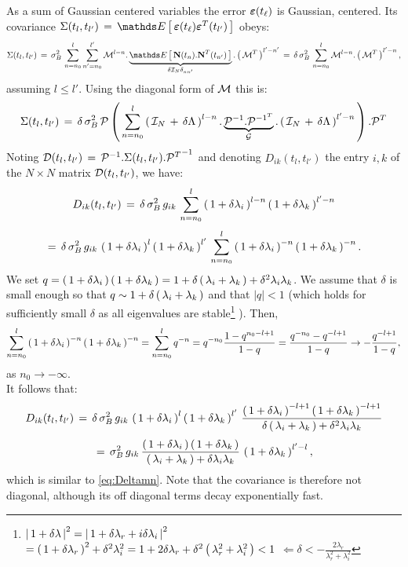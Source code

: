 \documentclass{article}
\begin{document}
 As a sum of Gaussian centered variables the error $\boldsymbol{\varepsilon}(t_\ell)$ is Gaussian, centered. Its covariance $\Sigma(t_l,t_{l'}) \,=\, \Exp{}{\mveb(t_\ell)\mveb^T(t_{l'})}$ obeys:
%
$$
\Sigma(t_l,t_{l'}) \,=\, \sigma_B^2 \, \sum_{n=n_0}^{l} \sum_{n'=n_0}^{l'} \cM^{l-n} . \underbrace{\Exp{}{\vN(t_{n}).\vN^T(t_{n'})}}_{\delta \cI_N \delta_{n n'}} . \pare{\cM^T}^{l'-n'}
\,=\, \delta \,\sigma_B^2 \,  \sum_{n=n_0}^{l} \cM^{l-n} . \pare{\cM^T}^{l'-n},
$$
%
assuming $l \leq l'$. Using the diagonal form of ${\mathcal M}$ this is:
%
$$
\Sigma(t_l,t_{l'}) \,=\, \delta \,\sigma_B^2 \,  {\mathcal P} \left(\, \sum_{n=n_0}^{l} \left(\, {\mathcal I}_N\,+\, \delta \Lambda \, \right)^{l-n}.\underbrace{{\mathcal P}^{-1}.{\mathcal P}^{{-1}^T}}_{{\mathcal G}}.\left(\, {\mathcal I}_N\,+\, \delta \Lambda \, \right)^{l'-n} \, \right).{\mathcal P}^T
$$
%
Noting ${\mathcal D}(t_l,t_{l'}) \,=\,{\mathcal P}^{-1}.\Sigma(t_l,t_{l'}).{{\mathcal P}^T}^{-1}$ and denoting $D_{ik}(t_l,t_{l'})$ the entry $i,k$ of the $N \times N$ matrix ${\mathcal D}(t_l,t_{l'})$, we have:
%
$$
D_{ik}(t_l,t_{l'}) \,=\, \delta \,\sigma_B^2 \,  g_{ik} \, \sum_{n=n_0}^{l} \left(\, 1+\delta \lambda_i \, \right)^{l-n}\left(\, 1+\delta \lambda_k \, \right)^{l'-n}
$$
%
$$
\,=\, \delta \,\sigma_B^2 \,  g_{ik} \, \left(\, 1+\delta \lambda_i \, \right)^{l}\left(\, 1+\delta \lambda_k \, \right)^{l'} \, \sum_{n=n_0}^{l} \left(\, 1+\delta \lambda_i \, \right)^{-n}\left(\, 1+\delta \lambda_k \, \right)^{-n}.
$$
%
We set $q=\left(\, 1+\delta \lambda_i \, \right)\left(\, 1+\delta \lambda_k \, \right) = 1 + \delta \left(\, \lambda_i+\lambda_k \, \right) + \delta^2 \lambda_i\lambda_k$. We assume that $\delta$ is small enough so that $q \sim 1 + \delta \left(\, \lambda_i+\lambda_k \, \right)$ and that $|q|<1$ (which holds for sufficiently small $\delta$ as all eigenvalues are stable\footnote{
$\left|\, 1+\delta\lambda \, \right|^2 = \left|\, 1+\delta \lambda_r + i \delta \lambda_i \, \right|^2$ 
$=\left(\, 1+\delta \lambda_r \, \right)^2 + \delta^2 \lambda_i^2  = 1 +2 \delta \lambda_r + \delta^2\left(\, \lambda_r^2+\lambda_i^2 \, \right)  < 1$  
$\Leftarrow \delta < - \frac{2 \lambda_r}{\lambda_r^2+\lambda_i^2}$ }
).
%
Then,
%
$$\sum_{n=n_0}^{l} \left(\, 1+\delta \lambda_i \, \right)^{-n}\left(\, 1+\delta \lambda_k \, \right)^{-n}
=\sum_{n=n_0}^{l} q^{-n} 
=q^{-n_0} \frac{1-q^{n_0-l+1}}{1-q}
=\frac{q^{-n_0}-q^{-l+1}}{1-q} 
 \to
- \frac{q^{-l+1}}{1-q}
,$$
%
as $n_0 \to -\infty$.\\
%
It follows that:
%
$$
D_{ik}(t_l,t_{l'}) \,=\, \delta \,\sigma_B^2 \,  g_{ik} \,
\left(\, 1+\delta \lambda_i \, \right)^{l}\left(\, 1+\delta \lambda_k \, \right)^{l'} \, \frac{\left(\, 1+\delta \lambda_i \, \right)^{-l+1}\left(\, 1+\delta \lambda_k \, \right)^{-l+1}}{\delta \left(\, \lambda_i+\lambda_k \, \right) + \delta^2 \lambda_i\lambda_k}
$$
%
$$
\,=\, \sigma_B^2 \,  g_{ik} \, \frac{\left(\, 1+\delta \lambda_i \, \right)\left(\, 1+\delta \lambda_k \, \right)}{\left(\, \lambda_i+\lambda_k \, \right) + \delta \lambda_i\lambda_k} \, \left(\, 1+\delta \lambda_k \, \right)^{l'-l},
$$
%
which is similar to \eqref{eq:Deltamn}.
%
%
Note that the covariance is therefore not diagonal, although its off diagonal terms decay exponentially fast.
\end{document}

